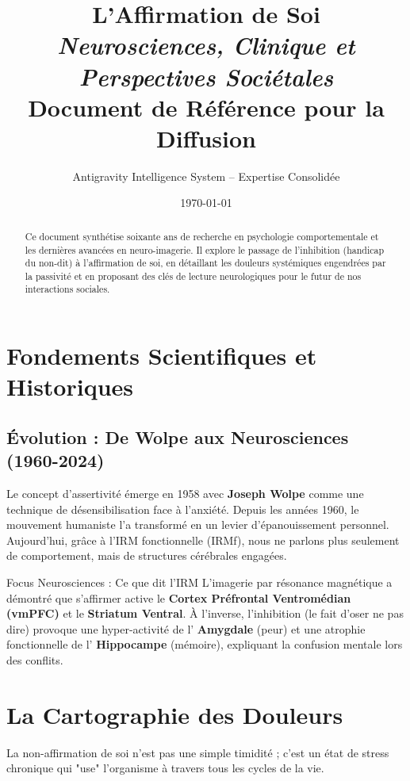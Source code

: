\documentclass[11.5pt,a4paper]{article}
\title{
    \vspace{-2cm}
    \Huge \textbf{L'Affirmation de Soi} \\
    \Large \textit{Neurosciences, Clinique et Perspectives Sociétales} \\
    \vspace{0.5cm}
    \large Document de Référence pour la Diffusion
}
\author{Antigravity Intelligence System -- Expertise Consolidée}
\date{\today}
\begin{document}
\maketitle

\begin{abstract}
Ce document synthétise soixante ans de recherche en psychologie comportementale et les dernières avancées en neuro-imagerie. Il explore le passage de l'inhibition (handicap du non-dit) à l'affirmation de soi, en détaillant les douleurs systémiques engendrées par la passivité et en proposant des clés de lecture neurologiques pour le futur de nos interactions sociales.
\end{abstract}

\tableofcontents
\newpage

\section{Fondements Scientifiques et Historiques}

\subsection{Évolution : De Wolpe aux Neurosciences (1960-2024)}
Le concept d'assertivité émerge en 1958 avec \textbf{Joseph Wolpe} comme une technique de désensibilisation face à l'anxiété. Depuis les années 1960, le mouvement humaniste l'a transformé en un levier d'épanouissement personnel. Aujourd'hui, grâce à l'IRM fonctionnelle (IRMf), nous ne parlons plus seulement de comportement, mais de structures cérébrales engagées.

\begin{FocusScience}{Focus Neurosciences : Ce que dit l'IRM}
L'imagerie par résonance magnétique a démontré que s'affirmer active le \textbf{Cortex Préfrontal Ventromédian (vmPFC)} et le \textbf{Striatum Ventral}. À l'inverse, l'inhibition (le fait d'oser ne pas dire) provoque une hyper-activité de l' \textbf{Amygdale} (peur) et une atrophie fonctionnelle de l' \textbf{Hippocampe} (mémoire), expliquant la confusion mentale lors des conflits.
\end{FocusScience}

\section{La Cartographie des Douleurs}

La non-affirmation de soi n'est pas une simple timidité ; c'est un état de stress chronique qui "use" l'organisme à travers tous les cycles de la vie.
\end{document}
